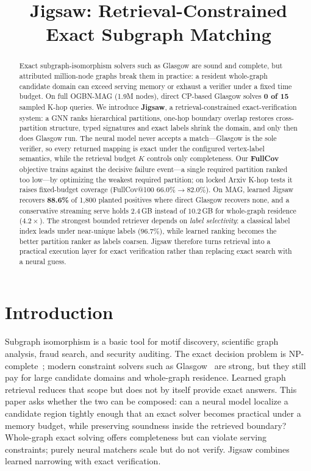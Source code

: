 \documentclass[runningheads]{llncs}
\begin{document}
\title{Jigsaw: Retrieval-Constrained Exact Subgraph Matching}
\author{}
\institute{}
\maketitle

\begin{abstract}
Exact subgraph-isomorphism solvers such as Glasgow are sound and complete, but attributed million-node graphs break them in practice: a resident whole-graph candidate domain can exceed serving memory or exhaust a verifier under a fixed time budget. On full OGBN-MAG (1.9M nodes), direct CP-based Glasgow solves \textbf{0 of 15} sampled K-hop queries. We introduce \textbf{Jigsaw}, a retrieval-constrained exact-verification system: a GNN ranks hierarchical partitions, one-hop boundary overlap restores cross-partition structure, typed signatures and exact labels shrink the domain, and only then does Glasgow run. The neural model never accepts a match---Glasgow is the sole verifier, so every returned mapping is exact under the configured vertex-label semantics, while the retrieval budget $K$ controls only completeness. Our \textbf{FullCov} objective trains against the decisive failure event---a single required partition ranked too low---by optimizing the weakest required partition; on locked Arxiv K-hop tests it raises fixed-budget coverage (FullCov@100 $66.0\%{\to}82.0\%$). On MAG, learned Jigsaw recovers \textbf{88.6\%} of 1,800 planted positives where direct Glasgow recovers none, and a conservative streaming serve holds $2.4$\,GB instead of $10.2$\,GB for whole-graph residence ($4.2\times$). The strongest bounded retriever depends on \emph{label selectivity}: a classical label index leads under near-unique labels ($96.7\%$), while learned ranking becomes the better partition ranker as labels coarsen. Jigsaw therefore turns retrieval into a practical execution layer for exact verification rather than replacing exact search with a neural guess.
\end{abstract}

\section{Introduction}

Subgraph isomorphism is a basic tool for motif discovery, scientific graph analysis, fraud search, and security auditing. The exact decision problem is NP-complete~\cite{ref_garey}; modern constraint solvers such as Glasgow~\cite{ref_glasgow} are strong, but they still pay for large candidate domains and whole-graph residence. Learned graph retrieval reduces that scope but does not by itself provide exact answers. This paper asks whether the two can be composed: can a neural model localize a candidate region tightly enough that an exact solver becomes practical under a memory budget, while preserving soundness inside the retrieved boundary? Whole-graph exact solving offers completeness but can violate serving constraints; purely neural matchers scale but do not verify. Jigsaw combines learned narrowing with exact verification.
\end{document}
